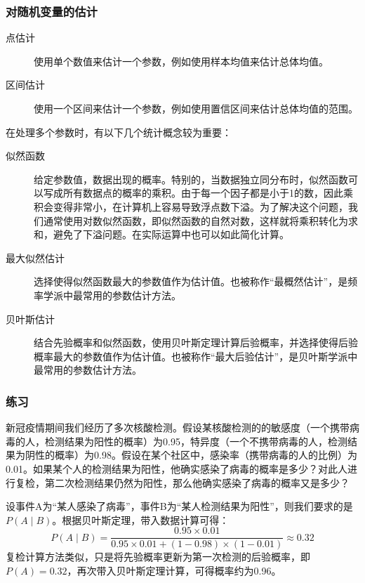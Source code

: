 \documentclass[aspectratio=1610]{ctexbeamer}
\begin{document}
\begin{frame}
    \frametitle{对随机变量的估计}

    \begin{description}
        \item[点估计] 使用单个数值来估计一个参数，例如使用样本均值来估计总体均值。
        \item[区间估计] 使用一个区间来估计一个参数，例如使用置信区间来估计总体均值的范围。
    \end{description}

    在处理多个参数时，有以下几个统计概念较为重要：
    \begin{description}
        \item[似然函数] 给定参数值，数据出现的概率。特别的，当数据独立同分布时，似然函数可以写成所有数据点的概率的乘积。由于每一个因子都是小于1的数，因此乘积会变得非常小，在计算机上容易导致浮点数下溢。为了解决这个问题，我们通常使用对数似然函数，即似然函数的自然对数，这样就将乘积转化为求和，避免了下溢问题。在实际运算中也可以如此简化计算。
        \item[最大似然估计] 选择使得似然函数最大的参数值作为估计值。也被称作“最概然估计”，是频率学派中最常用的参数估计方法。
        \item[贝叶斯估计] 结合先验概率和似然函数，使用贝叶斯定理计算后验概率，并选择使得后验概率最大的参数值作为估计值。也被称作“最大后验估计”，是贝叶斯学派中最常用的参数估计方法。
    \end{description}

\end{frame}

\begin{frame}
    \frametitle{练习}

    新冠疫情期间我们经历了多次核酸检测。假设某核酸检测的的敏感度（一个携带病毒的人，检测结果为阳性的概率）为0.95，特异度（一个不携带病毒的人，检测结果为阴性的概率）为0.98。假设在某个社区中，感染率（携带病毒的人的比例）为0.01。如果某个人的检测结果为阳性，他确实感染了病毒的概率是多少？对此人进行复检，第二次检测结果仍然为阳性，那么他确实感染了病毒的概率又是多少？
    
    \vspace{1em}
    \pause

    设事件A为“某人感染了病毒”，事件B为“某人检测结果为阳性”，则我们要求的是$P(A \mid B)$。根据贝叶斯定理，带入数据计算可得：
\begin{equation}
P(A \mid B) = \frac{0.95 \times 0.01}{0.95 \times 0.01 + (1 - 0.98) \times (1 - 0.01)} \approx 0.32
\end{equation}
    复检计算方法类似，只是将先验概率更新为第一次检测的后验概率，即$P(A) = 0.32$，再次带入贝叶斯定理计算，可得概率约为0.96。

\end{frame}
\end{document}
